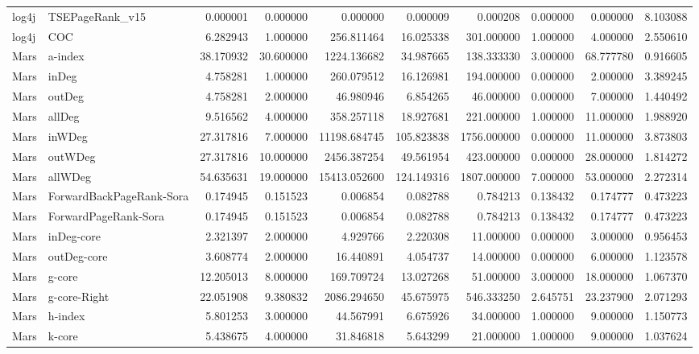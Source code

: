 \begin{tabular}{llrrrrrrrr}
log4j & TSEPageRank_v15 & 0.000001 & 0.000000 & 0.000000 & 0.000009 & 0.000208 & 0.000000 & 0.000000 & 8.103088 \\
log4j & COC & 6.282943 & 1.000000 & 256.811464 & 16.025338 & 301.000000 & 1.000000 & 4.000000 & 2.550610 \\
Mars & a-index & 38.170932 & 30.600000 & 1224.136682 & 34.987665 & 138.333330 & 3.000000 & 68.777780 & 0.916605 \\
Mars & inDeg & 4.758281 & 1.000000 & 260.079512 & 16.126981 & 194.000000 & 0.000000 & 2.000000 & 3.389245 \\
Mars & outDeg & 4.758281 & 2.000000 & 46.980946 & 6.854265 & 46.000000 & 0.000000 & 7.000000 & 1.440492 \\
Mars & allDeg & 9.516562 & 4.000000 & 358.257118 & 18.927681 & 221.000000 & 1.000000 & 11.000000 & 1.988920 \\
Mars & inWDeg & 27.317816 & 7.000000 & 11198.684745 & 105.823838 & 1756.000000 & 0.000000 & 11.000000 & 3.873803 \\
Mars & outWDeg & 27.317816 & 10.000000 & 2456.387254 & 49.561954 & 423.000000 & 0.000000 & 28.000000 & 1.814272 \\
Mars & allWDeg & 54.635631 & 19.000000 & 15413.052600 & 124.149316 & 1807.000000 & 7.000000 & 53.000000 & 2.272314 \\
Mars & ForwardBackPageRank-Sora & 0.174945 & 0.151523 & 0.006854 & 0.082788 & 0.784213 & 0.138432 & 0.174777 & 0.473223 \\
Mars & ForwardPageRank-Sora & 0.174945 & 0.151523 & 0.006854 & 0.082788 & 0.784213 & 0.138432 & 0.174777 & 0.473223 \\
Mars & inDeg-core & 2.321397 & 2.000000 & 4.929766 & 2.220308 & 11.000000 & 0.000000 & 3.000000 & 0.956453 \\
Mars & outDeg-core & 3.608774 & 2.000000 & 16.440891 & 4.054737 & 14.000000 & 0.000000 & 6.000000 & 1.123578 \\
Mars & g-core & 12.205013 & 8.000000 & 169.709724 & 13.027268 & 51.000000 & 3.000000 & 18.000000 & 1.067370 \\
Mars & g-core-Right & 22.051908 & 9.380832 & 2086.294650 & 45.675975 & 546.333250 & 2.645751 & 23.237900 & 2.071293 \\
Mars & h-index & 5.801253 & 3.000000 & 44.567991 & 6.675926 & 34.000000 & 1.000000 & 9.000000 & 1.150773 \\
Mars & k-core & 5.438675 & 4.000000 & 31.846818 & 5.643299 & 21.000000 & 1.000000 & 9.000000 & 1.037624 \\

\end{tabular}
